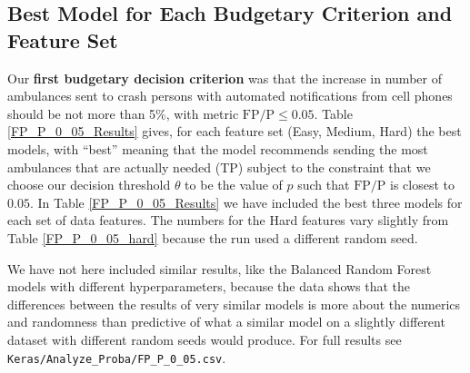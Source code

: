 \subsection{Best Model for Each Budgetary Criterion and Feature Set}
\label{results_best_model}

Our {\bf first budgetary decision criterion} was that the increase in number of ambulances sent to crash persons with automated notifications from cell phones should be not more than 5\%, with metric $\text{FP}/\text{P} \le 0.05$.  Table \ref{FP_P_0_05_Results} gives, for each feature set (Easy, Medium, Hard) the best models, with ``best'' meaning that the model recommends sending the most ambulances that are actually needed (TP) subject to the constraint that we choose our decision threshold $\theta$ to be the value of $p$ such that  $\text{FP}/\text{P}$ is closest to $0.05$.  In Table \ref{FP_P_0_05_Results} we have included the best three models for each set of data features.  The numbers for the Hard features vary slightly from Table \ref{FP_P_0_05_hard} because the run used a different random seed.

We have not here included similar results, like the Balanced Random Forest models with different hyperparameters, because the data shows that the differences between the results of very similar models is more about the numerics and randomness than predictive of what a similar model on a slightly different dataset with different random seeds would produce.  For full results see \verb|Keras/Analyze_Proba/FP_P_0_05.csv|.


